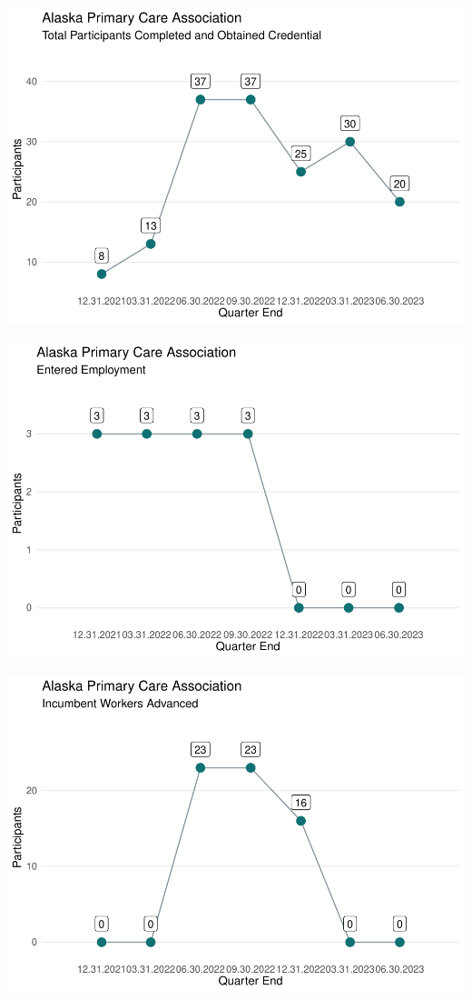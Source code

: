 \documentclass[
  landscape, table]{article}
\begin{document}
\includegraphics{rh_pdf_by_grantee_files/figure-latex/unnamed-chunk-7-1.pdf}

\includegraphics{rh_pdf_by_grantee_files/figure-latex/unnamed-chunk-8-1.pdf}

\includegraphics{rh_pdf_by_grantee_files/figure-latex/unnamed-chunk-9-1.pdf}
\end{document}
